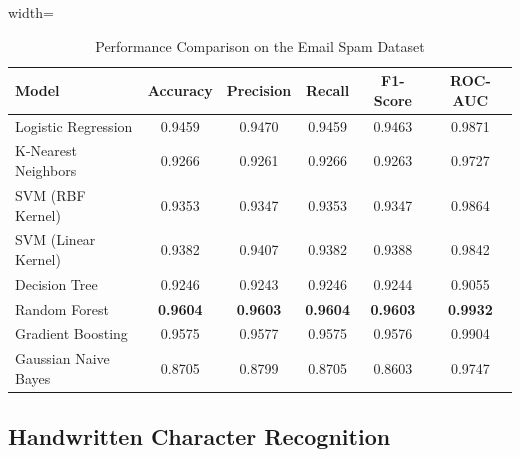 \documentclass[12pt,a4paper]{article}
\begin{document}
\begin{table}[H]
\centering
\caption{Performance Comparison on the Email Spam Dataset}
\label{tab:spam_results}

\renewcommand{\arraystretch}{1.2}

\begin{adjustbox}{width=\textwidth}
\begin{tabular}{|l|c|c|c|c|c|}

\toprule

\textbf{Model}
&
\textbf{Accuracy}
&
\textbf{Precision}
&
\textbf{Recall}
&
\textbf{F1-Score}
&
\textbf{ROC-AUC}

\\

\midrule

Logistic Regression
&
0.9459
&
0.9470
&
0.9459
&
0.9463
&
0.9871
\\

K-Nearest Neighbors
&
0.9266
&
0.9261
&
0.9266
&
0.9263
&
0.9727
\\

SVM (RBF Kernel)
&
0.9353
&
0.9347
&
0.9353
&
0.9347
&
0.9864
\\

SVM (Linear Kernel)
&
0.9382
&
0.9407
&
0.9382
&
0.9388
&
0.9842
\\

Decision Tree
&
0.9246
&
0.9243
&
0.9246
&
0.9244
&
0.9055
\\

Random Forest
&
\textbf{0.9604}
&
\textbf{0.9603}
&
\textbf{0.9604}
&
\textbf{0.9603}
&
\textbf{0.9932}
\\

Gradient Boosting
&
0.9575
&
0.9577
&
0.9575
&
0.9576
&
0.9904
\\

Gaussian Naive Bayes
&
0.8705
&
0.8799
&
0.8705
&
0.8603
&
0.9747
\\

\bottomrule

\end{tabular}
\end{adjustbox}

\end{table}

\subsection{Handwritten Character Recognition}
\end{document}
